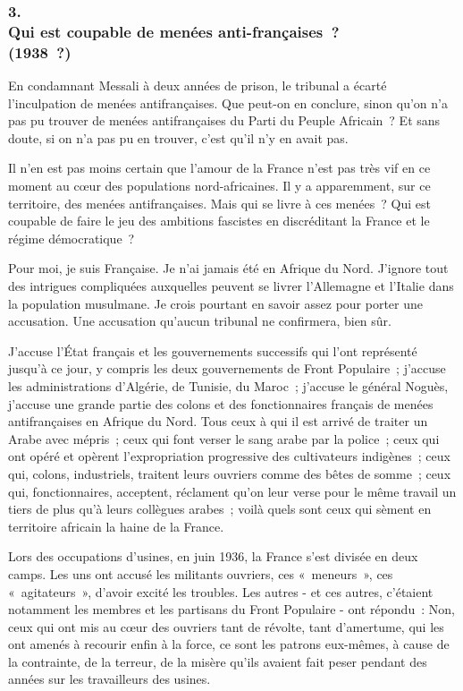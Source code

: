 \documentclass[french,twoside]{book} %
\begin{document}
\subsubsection[3. Qui est coupable de menées anti-françaises ? (1938 ?)]{3. \\
Qui est coupable de menées anti-françaises ? \\
(1938 ?)}
\noindent \par
En condamnant Messali à deux années de prison, le tribunal a écarté l'inculpation de menées antifrançaises. Que peut-on en conclure, sinon qu'on n'a pas pu trouver de menées antifrançaises du Parti du Peuple Africain ? Et sans doute, si on n'a pas pu en trouver, c'est qu'il n'y en avait pas.\par
Il n'en est pas moins certain que l'amour de la France n'est pas très vif en ce moment au cœur des populations nord-africaines. Il y a apparemment, sur ce territoire, des menées antifrançaises. Mais qui se livre à ces menées ? Qui est coupable de faire le jeu des ambitions fascistes en discréditant la France et le régime démocratique ?\par
Pour moi, je suis Française. Je n'ai jamais été en Afrique du Nord. J'ignore tout des intrigues compliquées auxquelles peuvent se livrer l'Allemagne et l'Italie dans la population musulmane. Je crois pourtant en savoir assez pour porter une accusation. Une accusation qu'aucun tribunal ne confirmera, bien sûr.\par
J'accuse l'État français et les gouvernements successifs qui l'ont représenté jusqu'à ce jour, y compris les deux gouvernements de Front Populaire ; j'accuse les administrations d'Algérie, de Tunisie, du Maroc ; j'accuse le général Noguès, j'accuse une grande partie des colons et des fonctionnaires français de menées antifrançaises en Afrique du Nord. Tous ceux à qui il est arrivé de traiter un Arabe avec mépris ; ceux qui font verser le sang arabe par la police ; ceux qui ont opéré et opèrent l'expropriation progressive des cultivateurs indigènes ; ceux qui, colons, industriels, traitent leurs ouvriers comme des bêtes de somme ; ceux qui, fonctionnaires, acceptent, réclament qu'on leur verse pour le même travail un tiers de plus qu'à leurs collègues arabes ; voilà quels sont ceux qui sèment en territoire africain la haine de la France.\par
Lors des occupations d'usines, en juin 1936, la France s'est divisée en deux camps. Les uns ont accusé les militants ouvriers, ces « meneurs », ces « agitateurs », d'avoir excité les troubles. Les autres - et ces autres, c'étaient notamment les membres et les partisans du Front Populaire - ont répondu : Non, ceux qui ont mis au cœur des ouvriers tant de révolte, tant d'amertume, qui les ont amenés à recourir enfin à la force, ce sont les patrons eux-mêmes, à cause de la contrainte, de la terreur, de la misère qu'ils avaient fait peser pendant des années sur les travailleurs des usines.\par
\end{document}
